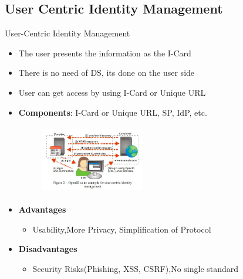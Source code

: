\documentclass[10pt,xcolor=dvipsnames]{beamer}
\begin{document}
\subsection{User Centric Identity Management}
\begin{frame}{User-Centric Identity Management}
\begin{itemize}
\item The user presents the information as the I-Card
\item There is no need of DS, its done on the user side
\item User can get access by using I-Card or Unique URL
\item \textbf{Components}: I-Card or Unique URL, SP, IdP, etc.
\begin{figure}
\includegraphics[width=4.5cm,height=3cm]{ucidm}
\end{figure}
\item \textbf{Advantages}
\begin{itemize}
	\item Usability,More Privacy, Simplification of Protocol
\end{itemize}
\item \textbf{Disadvantages}
\begin{itemize}
	\item Security Risks(Phishing, XSS, CSRF),No single standard 
\end{itemize}
\end{itemize}
\end{frame}
\end{document}
